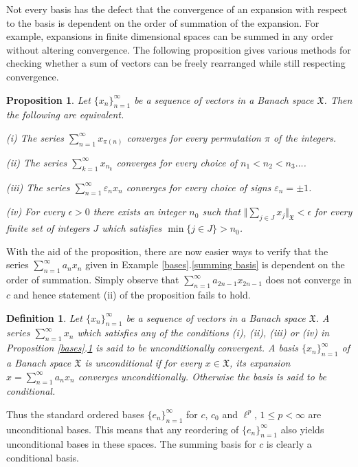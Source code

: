\documentclass[honours,12pt]{unswthesis}
\newcommand{\X}{\mathfrak{X}}
\newcommand{\reff}[2]{\ref{#1}.\ref{#2}}
\def\lp{\ell^p}
\def\ssnorm#1{\Vert #1 \Vert}
\newtheorem{proposition}[theorem]{Proposition}
\newtheorem{definition}[theorem]{Definition}
\numberwithin{equation}{section}
\begin{document}
Not every basis has the defect that the convergence of an expansion with respect
to the basis is dependent on the order of summation of the expansion. For
example, expansions in finite dimensional spaces can be summed in any order
without altering convergence. The following proposition gives various methods 
for
checking whether a sum of vectors can be freely rearranged while still
respecting convergence.

\begin{proposition}\label{unconditional conv}
\cite[Proposition 1.c.1]{Lind}
Let $\{x_n\}_{n=1}^{\infty}$ be a sequence of vectors in a Banach space $\X$.
Then the following are equivalent.

(i) The series $\sum_{n=1}^{\infty}x_{\pi(n)}$ converges for every permutation
$\pi$ of the integers.

(ii) The series $\sum_{k=1}^{\infty}x_{n_k}$ converges for every choice of
$n_1<n_2<n_3\ldots$.

(iii) The series $\sum_{n=1}^{\infty}\varepsilon_nx_n$ converges
for every choice of signs $\varepsilon_n=\pm 1$.

(iv) For every $\epsilon>0$ there exists an integer $n_0$ such that
$\ssnorm{\sum_{j\in J}x_j}_{\X}<\epsilon$ for every finite set of integers $J$
which satisfies $\min\{j\in J\}>n_0$.
\end{proposition}

With the aid of the proposition, there are now easier ways to verify that the
series
$\sum_{n=1}^{\infty}a_nx_n$ given in Example \reff{bases}{summing basis} is
dependent on the order of summation. Simply observe that
$\sum_{n=1}^{\infty}a_{2n-1}x_{2n-1}$ does not converge in $c$ and hence 
statement (ii) of the proposition fails to hold.

\begin{definition}
Let $\{x_n\}_{n=1}^{\infty}$ be a sequence of vectors in a Banach space $\X$.
A series $\sum_{n=1}^{\infty}x_n$ which satisfies any of the conditions (i),
(ii), (iii) or (iv) in Proposition \reff{bases}{unconditional conv} is said to 
be
{\em unconditionally convergent}. A basis $\{x_n\}_{n=1}^{\infty}$ of a Banach
space $\X$ is {\em unconditional} if for every $x\in\X$, its expansion
$x=\sum_{n=1}^{\infty}a_nx_n$ converges unconditionally. Otherwise the basis is
said to be {\em conditional}.
\end{definition}

Thus the standard ordered bases $\{e_n\}_{n=1}^{\infty}$ for $c$, $c_0$ and
$\lp$,
$1\leq p<\infty$ are unconditional bases. This means that any reordering of
$\{e_n\}_{n=1}^{\infty}$ also yields unconditional bases in these spaces.
The summing basis for $c$ is clearly a conditional basis.
\end{document}
